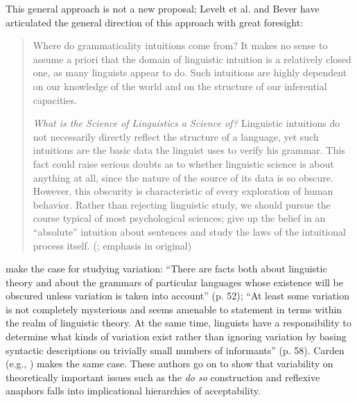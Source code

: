 This general approach is not a new proposal; Levelt et al. and Bever have articulated the general direction of this approach with great foresight:

\begin{quote}
Where do grammaticality intuitions come from? It makes no sense to assume a priori that the domain of linguistic intuition is a relatively closed one, as many linguists appear to do. Such intuitions are highly dependent on our knowledge of the world and on the structure of our inferential capacities. \citep[89]{LeveltEtAl1977}

\textit{What is the Science of Linguistics a Science of?} Linguistic intuitions do not necessarily directly reflect the structure of a language, yet such intuitions are the basic data the linguist uses to verify his grammar. This fact could raise serious doubts as to whether linguistic science is about anything at all, since the nature of the source of its data is so obscure. However, this obscurity is characteristic of every exploration of human behavior. Rather than rejecting linguistic study, we should pursue the course typical of most psychological sciences; give up the belief in an ``absolute'' intuition about sentences and study the laws of the intuitional process itself. (\citealt[346]{Bever1970a}; emphasis in original)
\end{quote}


\citet{ElliotEtAl1969} make the case for studying variation: ``There are facts both about linguistic theory and about the grammars of particular languages whose existence will be obscured unless variation is taken into account'' (p. 52); ``At least some variation is not completely mysterious and seems amenable to statement in terms within the realm of linguistic theory. At the same time, linguists have a responsibility to determine what kinds of variation exist rather than ignoring variation by basing syntactic descriptions on trivially small numbers of informants'' (p. 58). Carden (e.g., \citeyear{Carden1973}) makes the same case. These authors go on to show that variability on theoretically important issues such as the \textit{do so} construction and reflexive anaphors falls into implicational hierarchies of acceptability.


